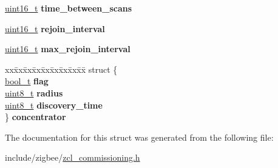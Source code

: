 \begin{DoxyCompactItemize}
\item 
\hyperlink{group__hal__dos_ga5a8b2dc9e45a9ee81a94ef304fb62505}{uint16\+\_\+t} {\bfseries time\+\_\+between\+\_\+scans}
\item 
\hyperlink{group__hal__dos_ga5a8b2dc9e45a9ee81a94ef304fb62505}{uint16\+\_\+t} {\bfseries rejoin\+\_\+interval}
\item 
\hyperlink{group__hal__dos_ga5a8b2dc9e45a9ee81a94ef304fb62505}{uint16\+\_\+t} {\bfseries max\+\_\+rejoin\+\_\+interval}
\item 
\begin{tabbing}
xx\=xx\=xx\=xx\=xx\=xx\=xx\=xx\=xx\=\kill
struct \{\\
\>\hyperlink{group__hal__dos_ga04dd5074964518403bf944f2b240a5f8}{bool\_t} {\bfseries flag}\\
\>\hyperlink{group__hal__dos_gae1affc9ca37cfb624959c866a73f83c2}{uint8\_t} {\bfseries radius}\\
\>\hyperlink{group__hal__dos_gae1affc9ca37cfb624959c866a73f83c2}{uint8\_t} {\bfseries discovery\_time}\\
\} {\bfseries concentrator}\\

\end{tabbing}\end{DoxyCompactItemize}


The documentation for this struct was generated from the following file\+:\begin{DoxyCompactItemize}
\item 
include/zigbee/\hyperlink{zcl__commissioning_8h}{zcl\+\_\+commissioning.\+h}\end{DoxyCompactItemize}
